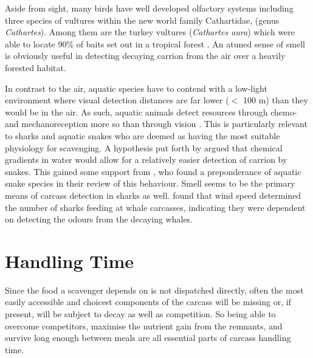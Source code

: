 \documentclass[a4paper,12pt]{article}
\begin{document}
Aside from sight, many birds have well developed olfactory systems \citep{AR:AR22815} including three species of vultures within the new world family Cathartidae, (genus \textit{Cathartes}).
Among them are the turkey vultures (\textit{Cathartes aura}) which were able to locate 90\% of baits set out in a tropical forest \citep{houston1986olfaction}.
An atuned sense of smell is obviously useful in detecting decaying carrion from the air over a heavily forested habitat.

In contrast to the air, aquatic species have to contend with a low-light environment where visual detection distances are far lower ($<$ 100 m) than they would be in the air.
As such, aquatic animals detect resources through chemo- and mechanoreception more so than through vision \citep{ruxton2004energetic}.
This is particularly relevant to sharks and aquatic snakes who are deemed as having the most suitable physiology for scavenging.
A hypothesis put forth by \cite{sazima1990necrofagia} argued that chemical gradients in water would allow for a relatively easier detection of carrion by snakes.
This gained some support from \cite{devault2002scavenging}, who found a preponderance of aquatic snake species in their review of this behaviour.
Smell seems to be the primary means of carcass detection in sharks as well. 
\cite{fallows2013white} found that wind speed determined the number of sharks feeding at whale carcasses, indicating they were dependent on detecting the odours from the decaying whales. 






\section*{Handling Time}
Since the food a scavenger depends on is not dispatched directly, often the most easily accessible and choicest components of the carcass will be missing or, if present, will be subject to decay as well as competition.
So being able to overcome competitors, maximise the nutrient gain from the remnants, and survive long enough between meals are all essential parts of carcass handling time. 
\end{document}
